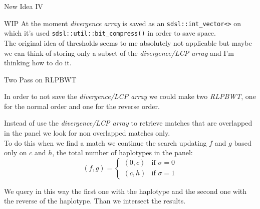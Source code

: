 \documentclass{beamer}
\begin{document}
\begin{frame}{New Idea IV}
  \begin{block}{WIP}
    At the moment \textit{divergence array} is saved as an
    \texttt{sdsl::int\_vector<>} on which it's used
    \texttt{sdsl::util::bit\_compress()} in order to save space.\\
    The original idea of thresholds seems to me absolutely not applicable but
    maybe we can think of storing only a subset of the \textit{divergence/LCP
      array} and I'm thinking how to do it.   
  \end{block}
\end{frame}
\begin{frame}{Two Pass on RLPBWT}
  \begin{block}{}
    In order to not save the \textit{divergence/LCP array} we could make two
    \textit{RLPBWT}, one for the normal order and one for the reverse order.
  \end{block}
  \begin{block}{}
    Instead of use the \textit{divergence/LCP array} to retrieve matches
    that are overlapped in the panel we look for non overlapped matches only.\\
    To do this when we find a match we continue the search updating $f$ and $g$
    based only on $c$ and $h$, the total number of haplotypes in the panel:
    \[(f,g)=
      \begin{cases}
        (0, c) & \mbox{if } \sigma=0\\
        (c, h) & \mbox{if } \sigma=1
      \end{cases}
    \]
  \end{block}
  \begin{block}{}
    We query in this way the first one with the haplotype and the second one
    with the reverse of the haplotype. Than we intersect the results.
  \end{block}
\end{frame}
\end{document}
